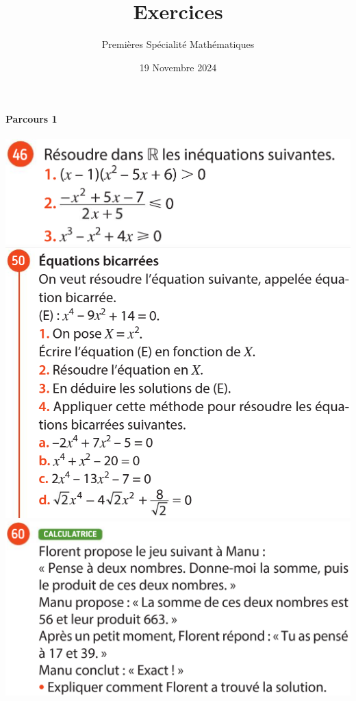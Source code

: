 \documentclass{article}
\title{Exercices}
\date{19 Novembre 2024}
\author{Premières Spécialité Mathématiques}
\begin{document}
\maketitle

\hfill
\begin{minipage}{0.45\textwidth}
\paragraph{Parcours 1}\hfill

\includegraphics[width=\textwidth]{Exercice_4.png}
\includegraphics[width=\textwidth]{Exercice_1.png}
\includegraphics[width=\textwidth]{Exercice_3.png}
\end{minipage}
\end{document}
